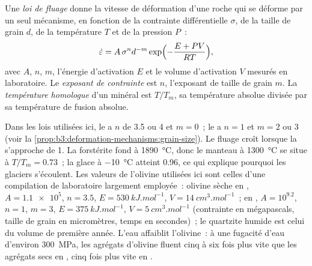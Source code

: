 \begin{definition}\label{def:b3:deformation-mechanisms:flow-law}
Une \emph{loi de fluage} donne la vitesse de déformation d'une roche qui se déforme par
un seul mécanisme, en fonction de la contrainte différentielle $\sigma$, de la taille de grain
$d$, de la température $T$ et de la pression $P$~:
\[
  \dot\varepsilon = A\,\sigma^nd^{-m}\exp\Bigl(-\frac{E + PV}{RT}\Bigr),
\]
avec $A$, $n$, $m$, l'énergie d'activation $E$ et le volume d'activation $V$
mesurés en laboratoire. Le \emph{exposant de contrainte}
est $n$, l'exposant de taille de grain $m$. La \emph{température
homologue} d'un minéral est $T/T_m$, sa température absolue
divisée par sa température de fusion absolue.
\end{definition}

Dans les lois utilisées ici, le  a $n$ de 3.5 ou 4 et $m = 0$~;
le  a $n = 1$ et $m = 2$ ou 3 (voir la \cref{prop:b3:deformation-mechanisms:grain-size}).
Le fluage croît lorsque la  s'approche de 1. La forstérite fond à \qty{1890}{\celsius}, donc le manteau à \qty{1300}{\celsius}
se situe à $T/T_m = 0.73$~; la glace à \qty{-10}{\celsius} atteint 0.96, ce qui explique pourquoi les glaciers
s'écoulent. Les valeurs de l'olivine utilisées ici sont celles
d'une compilation de laboratoire largement employée~: olivine sèche en , $A =
\num{1.1e5}$, $n = 3.5$, $E = \qty{530}{kJ.mol^{-1}}$, $V =
\qty{14}{cm^3.mol^{-1}}$~; en , $A = 10^{9.2}$, $n = 1$, $m = 3$,
$E = \qty{375}{kJ.mol^{-1}}$, $V = \qty{5}{cm^3.mol^{-1}}$ (contrainte en mégapascals,
taille de grain en micromètres, temps en secondes)~; le quartzite humide est celui du
volume de première année. L'eau affaiblit l'olivine~: à une fugacité d'eau d'environ
\qty{300}{MPa}, les agrégats d'olivine fluent cinq à six fois plus vite que les
agrégats secs en , cinq fois plus vite en .

